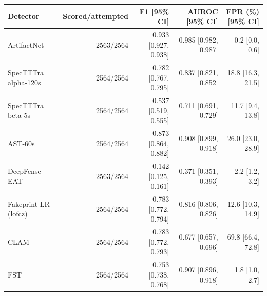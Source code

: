 \begin{tabular}{lrrrr}
\toprule
Detector & Scored/attempted & F1 [95\% CI] & AUROC [95\% CI] & FPR (\%) [95\% CI] \\
\midrule
ArtifactNet & 2563/2564 & 0.933 [0.927, 0.938] & 0.985 [0.982, 0.987] & 0.2 [0.0, 0.6] \\
SpecTTTra alpha-120s & 2564/2564 & 0.782 [0.767, 0.795] & 0.837 [0.821, 0.852] & 18.8 [16.3, 21.5] \\
SpecTTTra beta-5s & 2564/2564 & 0.537 [0.519, 0.555] & 0.711 [0.691, 0.729] & 11.7 [9.4, 13.8] \\
AST-60s & 2564/2564 & 0.873 [0.864, 0.882] & 0.908 [0.899, 0.918] & 26.0 [23.0, 28.9] \\
DeepFense EAT & 2563/2564 & 0.142 [0.125, 0.161] & 0.371 [0.351, 0.393] & 2.2 [1.2, 3.2] \\
Fakeprint LR (lofcz) & 2564/2564 & 0.783 [0.772, 0.794] & 0.816 [0.806, 0.826] & 12.6 [10.3, 14.9] \\
CLAM & 2564/2564 & 0.783 [0.772, 0.793] & 0.677 [0.657, 0.696] & 69.8 [66.4, 72.8] \\
FST & 2564/2564 & 0.753 [0.738, 0.768] & 0.907 [0.896, 0.918] & 1.8 [1.0, 2.7] \\
\bottomrule
\end{tabular}
